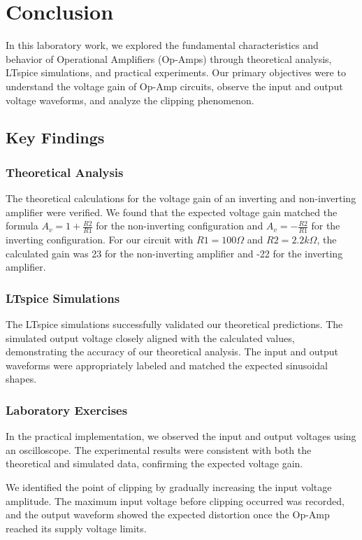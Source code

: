 \chapter{Conclusion}

In this laboratory work, we explored the fundamental characteristics and behavior of Operational Amplifiers (Op-Amps) through theoretical analysis, LTspice simulations, and practical experiments. Our primary objectives were to understand the voltage gain of Op-Amp circuits, observe the input and output voltage waveforms, and analyze the clipping phenomenon.

\section{Key Findings}

\subsection{Theoretical Analysis}

The theoretical calculations for the voltage gain of an inverting and non-inverting amplifier were verified. We found that the expected voltage gain matched the formula \( A_v = 1 + \frac{R2}{R1} \) for the non-inverting configuration and \( A_v = -\frac{R2}{R1} \) for the inverting configuration. For our circuit with \( R1 = 100\Omega \) and \( R2 = 2.2k\Omega \), the calculated gain was 23 for the non-inverting amplifier and -22 for the inverting amplifier.

\subsection{LTspice Simulations}
The LTspice simulations successfully validated our theoretical predictions. The simulated output voltage closely aligned with the calculated values, demonstrating the accuracy of our theoretical analysis. The input and output waveforms were appropriately labeled and matched the expected sinusoidal shapes.

\subsection{Laboratory Exercises}
In the practical implementation, we observed the input and output voltages using an oscilloscope. The experimental results were consistent with both the theoretical and simulated data, confirming the expected voltage gain.

We identified the point of clipping by gradually increasing the input voltage amplitude. The maximum input voltage before clipping occurred was recorded, and the output waveform showed the expected distortion once the Op-Amp reached its supply voltage limits.

